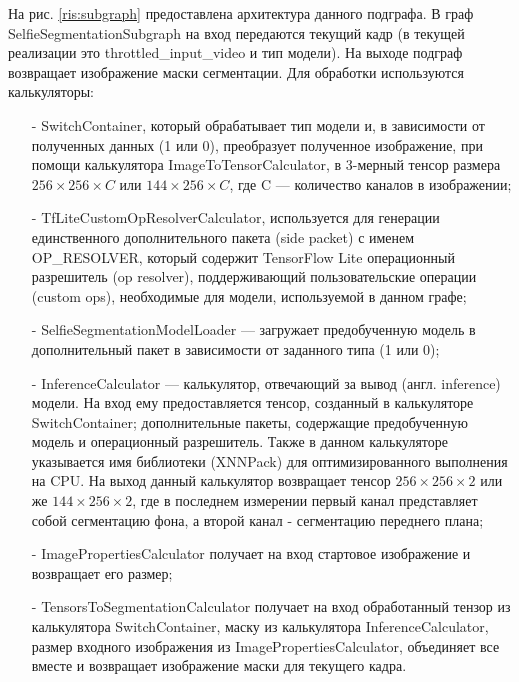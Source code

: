 \documentclass[a4paper,14pt]{extreport}
\begin{document}
        На рис. \ref{ris:subgraph} предоставлена архитектура данного подграфа. В граф SelfieSegmentationSubgraph на вход передаются текущий кадр (в текущей реализации это throttled\_input\_video и тип модели). На выходе подграф возвращает изображение маски сегментации. Для обработки используются калькуляторы:
        \begin{itemize}
          \item[-] SwitchContainer, который обрабатывает тип модели и, в зависимости от полученных данных (1 или 0), преобразует полученное изображение, при помощи калькулятора ImageToTensorCalculator, в 3-мерный тенсор размера $256 \times 256 \times C$ или $144 \times 256 \times C$, где C — количество каналов в изображении;
          
          \item[-] TfLiteCustomOpResolverCalculator, используется для генерации единственного дополнительного пакета (side packet) с именем OP\_RESOLVER, который содержит TensorFlow Lite операционный разрешитель (op resolver), поддерживающий пользовательские операции (custom ops), необходимые для модели, используемой в данном графе;
          
          
          \item[-] SelfieSegmentationModelLoader — загружает предобученную модель в дополнительный пакет в зависимости от заданного типа (1 или 0);
          

          \item[-] InferenceCalculator — калькулятор, отвечающий за вывод (англ. inference) модели. На вход ему предоставляется тенсор, созданный в калькуляторе SwitchContainer; дополнительные пакеты, содержащие предобученную модель и операционный разрешитель. Также в данном калькуляторе указывается имя библиотеки (XNNPack) для оптимизированного выполнения на CPU. На выход данный калькулятор возвращает тенсор $256 \times 256 \times 2$ или же $144 \times 256 \times 2$, где в последнем измерении первый канал представляет собой сегментацию фона, а второй канал - сегментацию переднего плана;
          

          \item[-] ImagePropertiesCalculator получает на вход стартовое изображение и возвращает его размер;
          
          
          \item[-] TensorsToSegmentationCalculator получает на вход обработанный тензор из калькулятора SwitchContainer, маску из калькулятора InferenceCalculator, размер входного изображения из ImagePropertiesCalculator, объединяет все вместе и возвращает изображение маски для текущего кадра. 
          
        \end{itemize}
\end{document}
